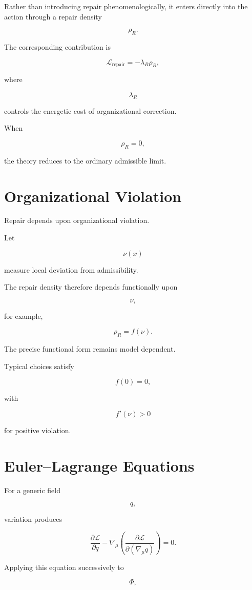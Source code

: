 \documentclass[11pt,oneside]{book}
\numberwithin{equation}{chapter}
\theoremstyle{definition}
\theoremstyle{plain}
\begin{document}
Rather than introducing repair phenomenologically, it enters directly into
the action through a repair density

\[
\rho_R.
\]

The corresponding contribution is

\[
\mathcal L_{\mathrm{repair}}
=
-\lambda_R
\rho_R,
\]

where

\[
\lambda_R
\]

controls the energetic cost of organizational correction.

When

\[
\rho_R
=
0,
\]

the theory reduces to the ordinary admissible limit.

\section{Organizational Violation}

Repair depends upon organizational violation.

Let

\[
\nu(x)
\]

measure local deviation from admissibility.

The repair density therefore depends functionally upon

\[
\nu,
\]

for example,

\[
\rho_R
=
f(\nu).
\]

The precise functional form remains model dependent.

Typical choices satisfy

\[
f(0)
=
0,
\]

with

\[
f'(\nu)
>
0
\]

for positive violation.

\section{Euler--Lagrange Equations}

For a generic field

\[
q,
\]

variation produces

\[
\frac{\partial\mathcal L}
{\partial q}
-
\nabla_\mu
\left(
\frac{\partial\mathcal L}
{\partial(\nabla_\mu q)}
\right)
=
0.
\]

Applying this equation successively to

\[
\Phi,
\]
\end{document}
